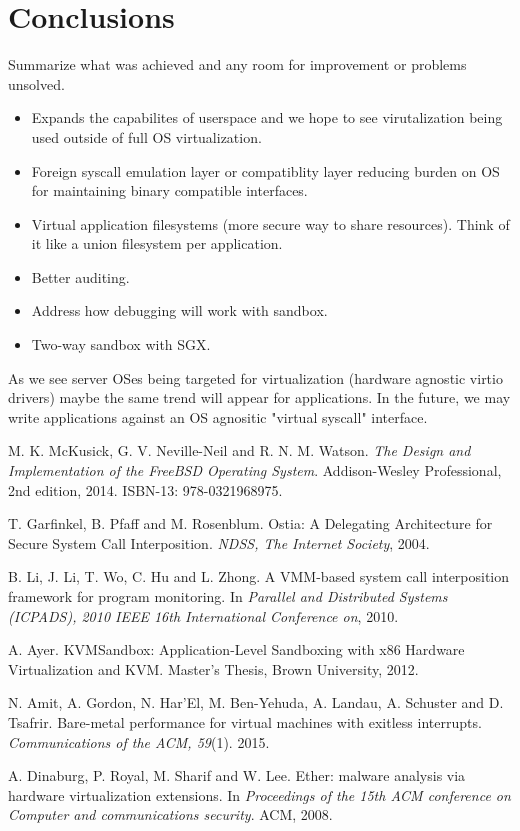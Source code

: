 \documentclass{article}
\begin{document}
\section{Conclusions}
Summarize what was achieved and any room for improvement or problems unsolved.

\begin{itemize}
    \item
        Expands the capabilites of userspace and we hope to see virutalization being used outside of full OS virtualization.
    \item
        Foreign syscall emulation layer or compatiblity layer reducing burden on OS for maintaining binary compatible interfaces.
    \item
        Virtual application filesystems (more secure way to share resources).
        Think of it like a union filesystem per application.
    \item
        Better auditing.
    \item
        Address how debugging will work with sandbox.
    \item
        Two-way sandbox with SGX.
\end{itemize}

As we see server OSes being targeted for virtualization (hardware agnostic virtio drivers) maybe the same trend will appear for applications.
In the future, we may write applications against an OS agnositic "virtual syscall" interface.

\begin{thebibliography}{99}

M. K. McKusick, G. V. Neville-Neil and R. N. M. Watson.
\emph{The Design and Implementation of the FreeBSD Operating System}.
Addison-Wesley Professional,
2nd edition,
2014.
ISBN-13: 978-0321968975.

T. Garfinkel, B. Pfaff and M. Rosenblum.
Ostia: A Delegating Architecture for Secure System Call Interposition.
\emph{NDSS, The Internet Society}, 2004.

B. Li, J. Li, T. Wo, C. Hu and L. Zhong.
A VMM-based system call interposition framework for program monitoring.
In \emph{Parallel and Distributed Systems (ICPADS), 2010 IEEE 16th International Conference on}, 2010.

A. Ayer.
KVMSandbox: Application-Level Sandboxing with x86 Hardware Virtualization and KVM.
Master's Thesis, Brown University, 2012.

N. Amit, A. Gordon, N. Har'El, M. Ben-Yehuda, A. Landau, A. Schuster and D. Tsafrir.
Bare-metal performance for virtual machines with exitless interrupts.
\emph{Communications of the ACM, 59}(1). 2015.

A. Dinaburg, P. Royal, M. Sharif and W. Lee.
Ether: malware analysis via hardware virtualization extensions.
In \emph{Proceedings of the 15th ACM conference on Computer and communications security}.
ACM, 2008.
\end{thebibliography}
\end{document}
